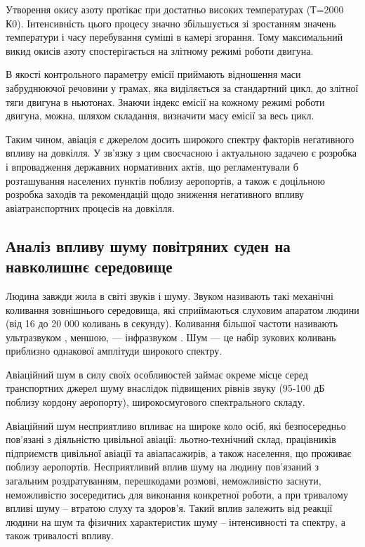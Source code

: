 Утворення окису азоту протікає при достатньо високих температурах (Т=2000 К0). Інтенсивність цього 
процесу значно збільшується зі зростанням значень температури і часу перебування суміші в камері згорання. 
Тому максимальний викид окисів азоту спостерігається на злітному режимі роботи двигуна.

В якості контрольного параметру емісії приймають відношення маси забруднюючої речовини у грамах, 
яка виділяється за стандартний цикл, до злітної тяги двигуна в ньютонах. Знаючи індекс емісії на 
кожному режимі роботи двигуна, можна, шляхом складання, визначити масу емісії за весь цикл.


Таким чином, авіація є джерелом досить широкого спектру факторів негативного впливу на довкілля. 
У зв’язку з цим своєчасною і актуальною задачею є розробка і впровадження державних нормативних 
актів, що регламентували б розташування населених пунктів поблизу аеропортів, а також є доцільною 
розробка заходів та рекомендацій щодо зниження негативного впливу авіатранспортних процесів на довкілля.

\subsection{Аналіз впливу шуму повітряних суден на навколишнє середовище}

Людина завжди жила в світі звуків і шуму. Звуком називають такі механічні коливання зовнішнього 
середовища, які сприймаються слуховим апаратом людини (від 16 до 20 000 коливань в секунду). 
Коливання більшої частоти називають ультразвуком , меншою, --- інфразвуком . Шум --- це набір 
зукових коливань приблизно однакової амплітуди широкого спектру. 

Авіаційний шум в силу своїх особливостей займає окреме місце серед транспортних джерел шуму внаслідок 
підвищених рівнів звуку (95-100 дБ поблизу кордону аеропорту), широкосмугового спектрального складу. 

Авіаційний шум несприятливо впливає на широке коло осіб, які безпосередньо пов’язані з діяльністю 
цивільної авіації: льотно-технічний склад, працівників підприємств цивільної авіації та авіапасажирів, 
а також населення, що проживає поблизу аеропортів. Несприятливий вплив шуму на людину пов’язаний з 
загальним роздратуванням, перешкодами розмові, неможливістю заснути, неможливістю зосередитись для 
виконання конкретної роботи, а при тривалому впливі шуму – втратою слуху та здоров’я. Такий вплив 
залежить від реакції людини на шум та фізичних характеристик шуму – інтенсивності та спектру, а 
також тривалості впливу.

